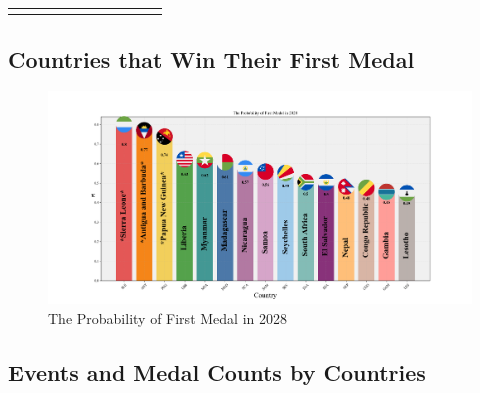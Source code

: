 \documentclass[12pt]{article}  %
\begin{document}
\begin{longtable}{l|c|c|c|c|c|c|c|c|c|c}
	\multicolumn{1}{l}{} & \multicolumn{1}{c}{}                                                   & \multicolumn{1}{c}{}                                                   & \multicolumn{1}{c}{}                                                   & \multicolumn{1}{c}{}                                                   & \multicolumn{1}{c}{}                                                   & \multicolumn{1}{c}{}                                                   & \multicolumn{1}{c}{}      & \multicolumn{1}{c}{}        & \multicolumn{1}{c}{}        &                           
\end{longtable}







\subsection{Countries that Win Their First Medal}


\begin{figure}[htbp]
	\centering
	\includegraphics[width=16cm]{img/First.png}
	\caption{The Probability of First Medal in 2028}
	\label{fig:aa}
\end{figure}




\subsection{Events and Medal Counts by Countries}
\end{document}
